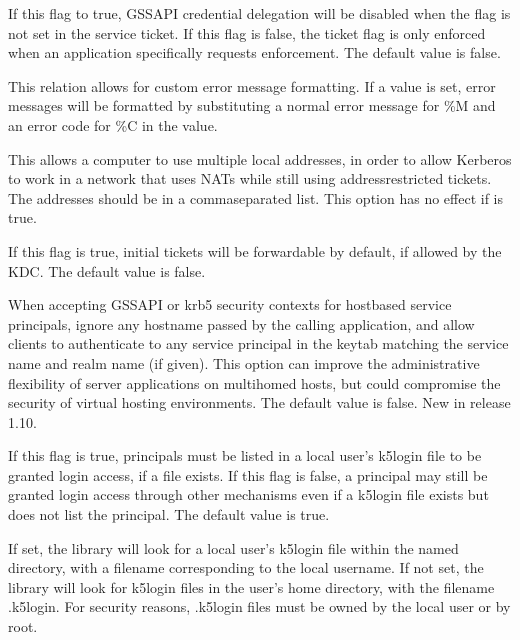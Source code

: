 \documentclass[letterpaper,10pt,english]{sphinxmanual}
\begin{document}
\begin{description}
\sphinxAtStartPar
If this flag to true, GSSAPI credential delegation will be
disabled when the  flag is not set in the
service ticket.  If this flag is false, the 
ticket flag is only enforced when an application specifically
requests enforcement.  The default value is false.

\sphinxAtStartPar
This relation allows for custom error message formatting.  If a
value is set, error messages will be formatted by substituting a
normal error message for \%M and an error code for \%C in the value.

\sphinxAtStartPar
This allows a computer to use multiple local addresses, in order
to allow Kerberos to work in a network that uses NATs while still
using address\sphinxhyphen{}restricted tickets.  The addresses should be in a
comma\sphinxhyphen{}separated list.  This option has no effect if
 is true.

\sphinxAtStartPar
If this flag is true, initial tickets will be forwardable by
default, if allowed by the KDC.  The default value is false.

\sphinxAtStartPar
When accepting GSSAPI or krb5 security contexts for host\sphinxhyphen{}based
service principals, ignore any hostname passed by the calling
application, and allow clients to authenticate to any service
principal in the keytab matching the service name and realm name
(if given).  This option can improve the administrative
flexibility of server applications on multihomed hosts, but could
compromise the security of virtual hosting environments.  The
default value is false.  New in release 1.10.

\sphinxAtStartPar
If this flag is true, principals must be listed in a local user’s
k5login file to be granted login access, if a 
file exists.  If this flag is false, a principal may still be
granted login access through other mechanisms even if a k5login
file exists but does not list the principal.  The default value is
true.

\sphinxAtStartPar
If set, the library will look for a local user’s k5login file
within the named directory, with a filename corresponding to the
local username.  If not set, the library will look for k5login
files in the user’s home directory, with the filename .k5login.
For security reasons, .k5login files must be owned by
the local user or by root.


\end{description}
\end{document}
